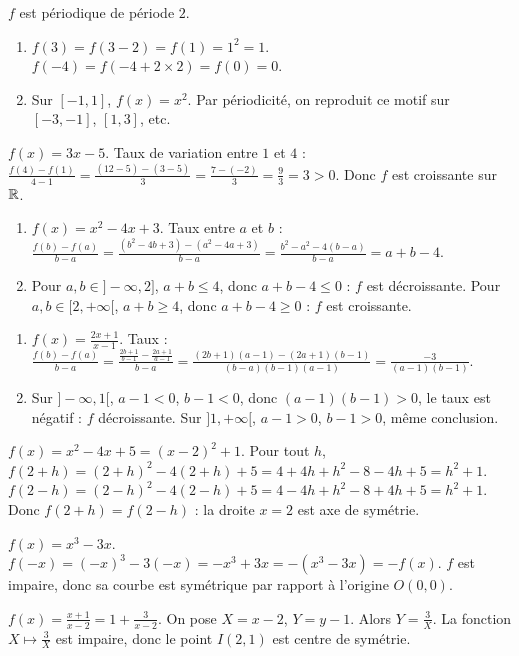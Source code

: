 $f$ est périodique de période $2$.
\begin{enumerate}[label=\alph*)]
\item $f(3)=f(3-2)=f(1)=1^2=1$. $f(-4)=f(-4+2\times2)=f(0)=0$.
\item Sur $[-1,1]$, $f(x)=x^2$. Par périodicité, on reproduit ce motif sur $[-3,-1]$, $[1,3]$, etc.
\end{enumerate}

$f(x)=3x-5$. Taux de variation entre $1$ et $4$ : $\frac{f(4)-f(1)}{4-1}=\frac{(12-5)-(3-5)}{3}=\frac{7-(-2)}{3}=\frac{9}{3}=3>0$. Donc $f$ est croissante sur $\mathbb{R}$.

\begin{enumerate}[label=\alph*)]
\item $f(x)=x^2-4x+3$. Taux entre $a$ et $b$ : $\frac{f(b)-f(a)}{b-a}=\frac{(b^2-4b+3)-(a^2-4a+3)}{b-a}=\frac{b^2-a^2-4(b-a)}{b-a}=a+b-4$.
\item Pour $a,b\in]-\infty,2]$, $a+b\le4$, donc $a+b-4\le0$ : $f$ est décroissante. Pour $a,b\in[2,+\infty[$, $a+b\ge4$, donc $a+b-4\ge0$ : $f$ est croissante.
\end{enumerate}

\begin{enumerate}[label=\alph*)]
\item $f(x)=\frac{2x+1}{x-1}$. Taux : $\frac{f(b)-f(a)}{b-a}=\frac{\frac{2b+1}{b-1}-\frac{2a+1}{a-1}}{b-a}=\frac{(2b+1)(a-1)-(2a+1)(b-1)}{(b-a)(b-1)(a-1)}=\frac{-3}{(a-1)(b-1)}$.
\item Sur $]-\infty,1[$, $a-1<0$, $b-1<0$, donc $(a-1)(b-1)>0$, le taux est négatif : $f$ décroissante. Sur $]1,+\infty[$, $a-1>0$, $b-1>0$, même conclusion.
\end{enumerate}

$f(x)=x^2-4x+5=(x-2)^2+1$. Pour tout $h$, $f(2+h)=(2+h)^2-4(2+h)+5=4+4h+h^2-8-4h+5=h^2+1$. $f(2-h)=(2-h)^2-4(2-h)+5=4-4h+h^2-8+4h+5=h^2+1$. Donc $f(2+h)=f(2-h)$ : la droite $x=2$ est axe de symétrie.

$f(x)=x^3-3x$. $f(-x)=(-x)^3-3(-x)=-x^3+3x=-(x^3-3x)=-f(x)$. $f$ est impaire, donc sa courbe est symétrique par rapport à l'origine $O(0,0)$.

$f(x)=\frac{x+1}{x-2}=1+\frac{3}{x-2}$. On pose $X=x-2$, $Y=y-1$. Alors $Y=\frac{3}{X}$. La fonction $X\mapsto\frac{3}{X}$ est impaire, donc le point $I(2,1)$ est centre de symétrie.

